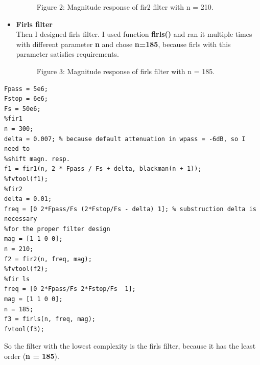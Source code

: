 \documentclass[16pt]{report}
\begin{document}
\begin{itemize}
\begin{figure}[h!]
    \caption{Figure 2: Magnitude response of fir2 filter with n = 210.}
    \label{fig:my_label}
\end{figure}
\newpage
\item\textbf{Firls filter} \\
Then I designed firls filter. I used function \textbf{firls()} and ran it multiple times with different parameter \textbf{n} and chose \textbf{n=185}, because firls with this parameter satisfies requirements.
\begin{figure}[h!]
    \caption{Figure 3: Magnitude response of firls filter with n = 185.}
    \label{fig:my_label}
\end{figure}
\end{itemize}
\newpage
\begin{lstlisting}
Fpass = 5e6;
Fstop = 6e6;
Fs = 50e6;
%fir1
n = 300;
delta = 0.007; % because default attenuation in wpass = -6dB, so I need to 
%shift magn. resp.
f1 = fir1(n, 2 * Fpass / Fs + delta, blackman(n + 1));
%fvtool(f1);
%fir2
delta = 0.01;
freq = [0 2*Fpass/Fs (2*Fstop/Fs - delta) 1]; % substruction delta is necessary 
%for the proper filter design
mag = [1 1 0 0];
n = 210;
f2 = fir2(n, freq, mag);
%fvtool(f2);
%fir ls
freq = [0 2*Fpass/Fs 2*Fstop/Fs  1]; 
mag = [1 1 0 0];
n = 185;
f3 = firls(n, freq, mag);
fvtool(f3);
\end{lstlisting}
So the filter with the lowest complexity is the firls filter, because it has the least order (\textbf{n = 185}).
\end{document}
